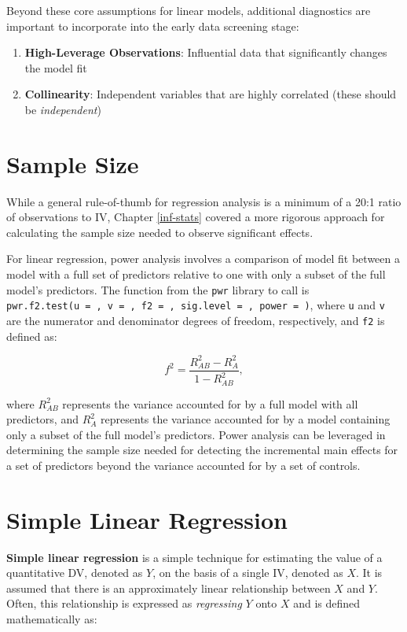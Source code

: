 \documentclass[
]{book}
\providecommand{\tightlist}{%
  \setlength{\itemsep}{0pt}\setlength{\parskip}{0pt}}
\begin{document}
Beyond these core assumptions for linear models, additional diagnostics are important to incorporate into the early data screening stage:

\begin{enumerate}
\def\labelenumi{\arabic{enumi}.}
\tightlist
\item
  \textbf{High-Leverage Observations}: Influential data that significantly changes the model fit
\item
  \textbf{Collinearity}: Independent variables that are highly correlated (these should be \emph{independent})
\end{enumerate}

\hypertarget{sample-size}{%
\section{Sample Size}\label{sample-size}}

While a general rule-of-thumb for regression analysis is a minimum of a 20:1 ratio of observations to IV, Chapter \ref{inf-stats} covered a more rigorous approach for calculating the sample size needed to observe significant effects.

For linear regression, power analysis involves a comparison of model fit between a model with a full set of predictors relative to one with only a subset of the full model's predictors. The function from the \texttt{pwr} library to call is \texttt{pwr.f2.test(u\ =\ ,\ v\ =\ ,\ f2\ =\ ,\ sig.level\ =\ ,\ power\ =\ )}, where \texttt{u} and \texttt{v} are the numerator and denominator degrees of freedom, respectively, and \texttt{f2} is defined as:

\[ f^2 = \frac {R^2_{AB} - R^2_A}{1 - R^2_{AB}}, \]

where \(R^2_{AB}\) represents the variance accounted for by a full model with all predictors, and \(R^2_A\) represents the variance accounted for by a model containing only a subset of the full model's predictors. Power analysis can be leveraged in determining the sample size needed for detecting the incremental main effects for a set of predictors beyond the variance accounted for by a set of controls.

\hypertarget{simple-linear-regression}{%
\section{Simple Linear Regression}\label{simple-linear-regression}}

\textbf{Simple linear regression} is a simple technique for estimating the value of a quantitative DV, denoted as \(Y\), on the basis of a single IV, denoted as \(X\). It is assumed that there is an approximately linear relationship between \(X\) and \(Y\). Often, this relationship is expressed as \emph{regressing} \(Y\) onto \(X\) and is defined mathematically as:
\end{document}
